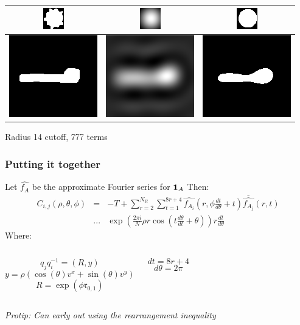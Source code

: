 \documentclass{beamer}
\begin{document}
\begin{frame}
\begin{center}
\begin{tabular}{|c|c|c|}
\hline
\includegraphics[height=.5in]{figures/fig_ind3.png} & 
\includegraphics[height=.5in]{figures/fig_ift3.png} & 
\includegraphics[height=.5in]{figures/fig_cut3.png} \\
\hline
\includegraphics[height=.5in]{figures/fig_ind4.png} & 
\includegraphics[height=.5in]{figures/fig_ift4.png} & 
\includegraphics[height=.5in]{figures/fig_cut4.png} \\
\hline
\end{tabular}

Radius 14 cutoff, 777 terms
\end{center}
\end{frame}

\begin{frame}
\frametitle{Putting it together}
Let $\hat{f_A}$ be the approximate Fourier series for ${\bf 1}_{A}$
\vskip5pt
Then:
\begin{eqnarray*}
C_{i,j}(\rho, \theta, \phi) & = & -T +
	\sum \limits_{r=2}^{N_R}
		 \sum \limits_{t = 1}^{8 r + 4} 
			\widehat{f_{A_i}} \left( r, \phi \frac{d t}{d \theta} + t \right) 
			\overline{\widehat{f_{A_j}}} \left( r, t \right) \\
& ... &	 	\exp \left( 
				\frac{2 \pi i}{N} \rho r 
				\cos \left( 
						t \frac{d \theta}{dt} + \theta 
				\right) 
			\right)
			r \frac{d t}{d \theta}
\end{eqnarray*}
Where:
\begin{columns}
		\[ q_j q_i^{-1} = (R, y) \]
		\[ y = \rho( \cos(\theta) v^x + \sin(\theta) v^y) \]
		\[ R = \exp(\phi \mathfrak{r}_{0,1}) \]
		
		\[ dt = 8r + 4 \]
		\[ d\theta = 2 \pi \]
\end{columns}
\pause
\vskip5pt
\emph{Protip: Can early out using the rearrangement inequality}
\end{frame}
\end{document}
